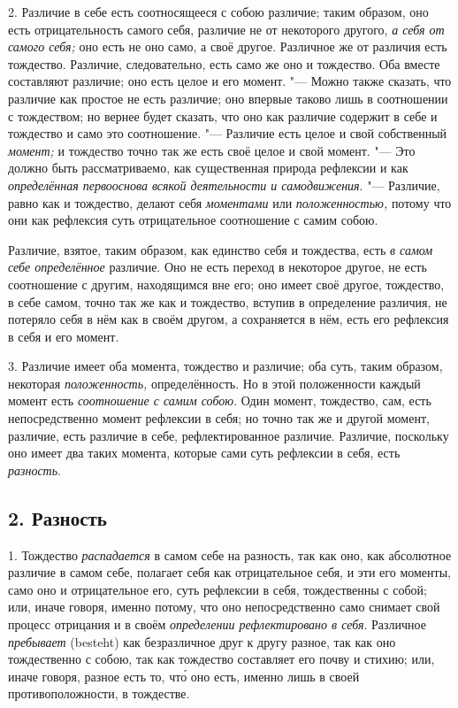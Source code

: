 2. Различие в себе есть соотносящееся с собою различие; таким образом, оно
есть отрицательность самого себя, различие не от некоторого другого,
{\em а себя от самого себя;} оно есть не оно само, а
своё другое. Различное же от различия есть тождество. Различие,
следовательно, есть само же оно и тождество. Оба вместе составляют
различие; оно есть целое и его момент. "--- Можно также сказать, что различие
как простое не есть различие; оно впервые таково лишь в соотношении с
тождеством; но вернее будет сказать, что оно как различие содержит в себе и
тождество и само это соотношение. "--- Различие есть целое и свой собственный
{\em момент;} и тождество точно так же есть своё целое
и свой момент. "--- Это должно быть рассматриваемо, как существенная природа
рефлексии и как {\em определённая первооснова всякой
деятельности и самодвижения}. "--- Различие, равно как и тождество, делают
себя {\em моментами} или
{\em положенностью,} потому что они как рефлексия суть
отрицательное соотношение с самим собою.

Различие, взятое, таким образом, как единство себя и тождества, есть
{\em в самом себе определённое} различие. Оно не есть
переход в некоторое другое, не есть соотношение с другим, находящимся вне
его; оно имеет своё другое, тождество, в себе самом, точно так же как и
тождество, вступив в определение различия, не потеряло себя в нём как в
своём другом, а сохраняется в нём, есть его рефлексия в себя и его момент.

3. Различие имеет оба момента, тождество и различие; оба суть, таким
образом, некоторая {\em положенность,} определённость.
Но в этой положенности каждый момент есть
{\em соотношение с самим собою}. Один момент,
тождество, сам, есть непосредственно момент рефлексии в себя; но точно так
же и другой момент, различие, есть различие в себе, рефлектированное
различие. Различие, поскольку оно имеет два таких момента, которые сами
суть рефлексии в себя, есть {\em разность}.

\subsection[2. Разность]{2. Разность}
1. Тождество {\em распадается} в самом себе на разность, так как
оно, как абсолютное различие в самом себе, полагает себя как отрицательное
себя, и эти его моменты, само оно и отрицательное его, суть рефлексии в
себя, тождественны с собой; или, иначе говоря, именно потому, что оно
непосредственно само снимает свой процесс отрицания и в своём
{\em определении рефлектировано в себя}. Различное
{\em пребывает} (besteht) как безразличное друг к другу
разное, так как оно тождественно с собою, так как тождество составляет его
почву и стихию; или, иначе говоря, разное есть то, чт\'{о} оно есть, именно
лишь в своей противоположности, в тождестве.

